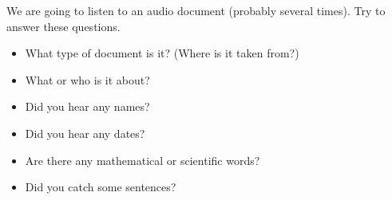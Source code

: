 \documentclass[11pt]{article}
\title{}
\date{}
\author{}
\begin{document}
We are going to listen to an audio document (probably several times). Try to
answer these questions.
\begin{itemize}
  \item What type of document is it? (Where is it taken from?)
  \item What or who is it about?
  \item Did you hear any names?
  \item Did you hear any dates?
  \item Are there any mathematical or scientific words?
  \item Did you catch some sentences?
\end{itemize}
\end{document}
